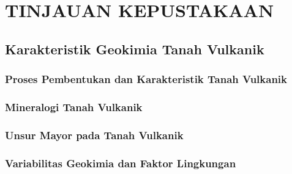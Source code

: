 
\chapter{TINJAUAN KEPUSTAKAAN}

\section{Karakteristik Geokimia Tanah Vulkanik}

\subsection{Proses Pembentukan dan Karakteristik Tanah Vulkanik}

\subsection{Mineralogi Tanah Vulkanik}

\subsection{Unsur Mayor pada Tanah Vulkanik}

\subsection{Variabilitas Geokimia dan Faktor Lingkungan}

